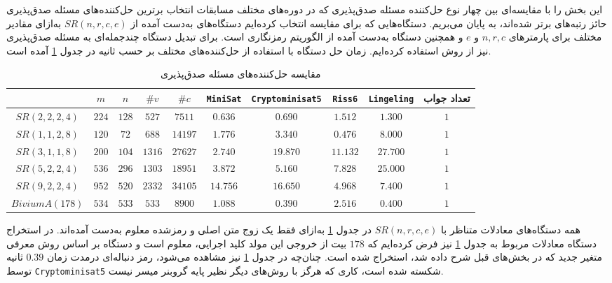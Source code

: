 این بخش را با   مقایسه‌ای بین چهار نوع حل‌کننده مسئله صدق‌پذیری که در دوره‌های مختلف مسابقات انتخاب برترین حل‌کننده‌های مسئله صدق‌پذیری حائز رتبه‌های برتر شده‌اند، به پایان می‌بریم‌. دستگاه‌هایی  که برای مقایسه انتخاب کرده‌ایم دستگاه‌های  به‌دست آمده از 
$SR(n, r, c, e)$
به‌ازای مقادیر مختلف برای پارمترهای 
$n, r, c$
و 
$e$
و همچنین دستگاه به‌دست آمده از الگوریتم رمزنگاری  
است. برای تبدیل دستگاه چندجمله‌ای به مسئله صدق‌پذیری  نیز از روش 
استفاده  کرده‌ایم.  زمان حل  دستگاه با استفاده از حل‌کننده‌های مختلف بر حسب ثانیه در جدول 
\ref{tab:comparison_sat_solvers}
آمده است. 
\begin{table}
\begin{center}
\begin{tabular}{||c|c|c|c|c|c|c|c|c|c||}
	\hline 
	& $m$ & $n$ & $\# v$ & $\# c$ & {\footnotesize \texttt{MiniSat}} & {\footnotesize \texttt{Cryptominisat5}} & {\footnotesize \texttt{Riss6}} & {\footnotesize \texttt{Lingeling}} & {\tiny تعداد جواب} \\ 
	\hline 
	\hline
	{\footnotesize $SR(2, 2, 2, 4)$} & $224$ & $128$ & $527$ & $7511$ & $0.636$ & $0.690$ & $1.512$ & $1.300$ & $1$ \\ 
	\hline 
	{\footnotesize $SR(1, 1, 2, 8)$} & $120$ & $72$ & $688$ & $14197$ & $1.776$ & $3.340$ & $0.476$ & $8.000$ & $1$ \\ 
	\hline 
	{\footnotesize $SR(3, 1, 1, 8)$} & $200$ & $104$ & $1316$ & $27627$ & $2.740$ & $19.870$ & $11.132$ & $27.700$ & $1$ \\ 
	\hline 
	{\footnotesize $SR(5, 2, 2, 4)$} & $536$ & $296$ & $1303$ & $18951$ & $3.872$ & $5.160$ & $7.828$ & $25.000$ & $1$ \\ 
	\hline 
	{\footnotesize $SR(9, 2, 2, 4)$} & $952$ & $520$ & $2332$ & $34105$ & $14.756$ & $16.650$ & $4.968$ & $7.400$ & $1$ \\ 
	\hline 
	{\footnotesize $BiviumA(178)$} & $534$ & $533$ & $533$ & $8900$ & $1.088$ & $0.390$ & $2.516$ & $0.400$ & $1$ \\ 
	\hline 
\end{tabular} 
\end{center}
\caption{مقایسه حل‌کننده‌های مسئله‌ صدق‌پذیری}
\label{tab:comparison_sat_solvers}
\end{table}
همه دستگاه‌های معادلات متناظر با 
$SR(n, r, c, e)$
در جدول 
\ref{tab:comparison_sat_solvers}
به‌ازای فقط یک زوج متن اصلی و رمزشده معلوم به‌دست آمده‌اند. در استخراج دستگاه معادلات 
مربوط به جدول 
\ref{tab:comparison_sat_solvers}
نیز فرض کرده‌ایم که 
$178$
بیت از خروجی این مولد کلید اجرایی، معلوم است و دستگاه بر اساس روش  معرفی متغیر جدید که در بخش‌های قبل شرح داده شد، استخراج شده است.  چنان‌چه در جدول 
\ref{tab:comparison_sat_solvers}
نیز مشاهده می‌شود،   رمز دنباله‌ای 
درمدت زمان 
$0.39$
ثانیه توسط 
\texttt{Cryptominisat5}
شکسته شده است، کاری که هرگز با روش‌های دیگر نظیر پایه گروبنر میسر نیست. 





